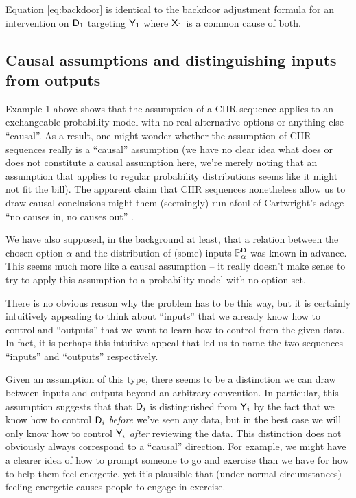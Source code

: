 Equation \eqref{eq:backdoor} is identical to the backdoor adjustment formula \citep[Chap. 1]{pearl_causality:_2009} for an intervention on $\mathsf{D}_1$ targeting $\mathsf{Y}_1$ where $\mathsf{X}_1$ is a common cause of both.

\subsection[No causes in, no causes out]{Causal assumptions and distinguishing inputs from outputs}\label{sec:nci_nco}

Example 1 above shows that the assumption of a CIIR sequence applies to an exchangeable probability model with no real alternative options or anything else ``causal''. As a result, one might wonder whether the assumption of CIIR sequences really is a ``causal'' assumption (we have no clear idea what does or does not constitute a causal assumption here, we're merely noting that an assumption that applies to regular probability distributions seems like it might not fit the bill). The apparent claim that CIIR sequences nonetheless allow us to draw causal conclusions might them (seemingly) run afoul of Cartwright's adage ``no causes in, no causes out'' \citep{cartwright_no_1994}.

We have also supposed, in the background at least, that a relation between the chosen option $\alpha$ and the distribution of (some) inputs $\mathbb{P}_\alpha^{\mathsf{D}}$ was known in advance. This seems much more like a causal assumption -- it really doesn't make sense to try to apply this assumption to a probability model with no option set.

There is no obvious reason why the problem has to be this way, but it is certainly intuitively appealing to think about ``inputs'' that we already know how to control and ``outputs'' that we want to learn how to control from the given data. In fact, it is perhaps this intuitive appeal that led us to name the two sequences ``inputs'' and ``outputs'' respectively.

Given an assumption of this type, there seems to be a distinction we can draw between inputs and outputs beyond an arbitrary convention. In particular, this assumption suggests that that $\mathsf{D}_i$ is distinguished from $\mathsf{Y}_i$ by the fact that we know how to control $\mathsf{D}_i$ \emph{before} we've seen any data, but in the best case we will only know how to control $\mathsf{Y}_i$ \emph{after} reviewing the data. This distinction does not obviously always correspond to a ``causal'' direction. For example, we might have a clearer idea of how to prompt someone to go and exercise than we have for how to help them feel energetic, yet it's plausible that (under normal circumstances) feeling energetic causes people to engage in exercise.

